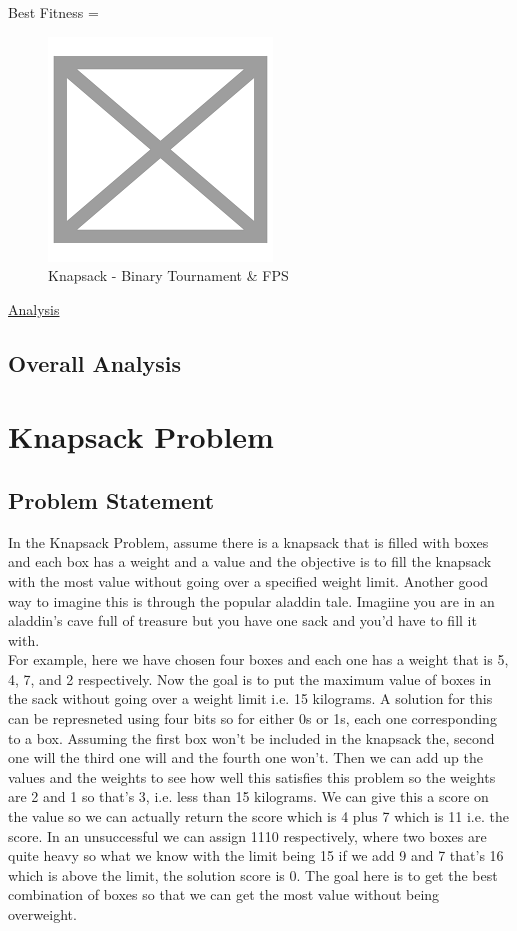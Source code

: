 \documentclass[11pt, letterpaper]{article}
\begin{document}
Best Fitness = 
\begin{figure}[H]
    \centering
    \includegraphics[scale = 0.6]{images/placeHolder.png}
    \caption {Knapsack - Binary Tournament \& FPS}
    \label {fig:tpsBF}
\end{figure}

\underline{Analysis}
\subsection {Overall Analysis}

\section{Knapsack Problem}
\subsection{Problem Statement}
In the Knapsack Problem, assume there is a knapsack that is filled with boxes and each box has a 
weight and a value and the objective is to fill the knapsack with the most value without going over 
a specified weight limit. Another good way to imagine this is through the popular aladdin tale. 
Imagiine you are in an aladdin's cave full of treasure but you have one sack and you'd have to fill 
it with.\\
For example, here we have chosen four boxes and each one has a weight that is 5, 4, 7, and 2 
respectively. Now the goal is to put the maximum value of boxes in the sack without going over a 
weight limit i.e. 15 kilograms. A solution for this can be represneted using four bits so for either 0s 
or 1s, each one corresponding to a box. Assuming the first box
won't be included in the knapsack 
the, second one will the third one will and the fourth one won't. Then we can add up the values 
and the weights to see how well this satisfies this problem so the weights are 2 and 1 so that's 3, i.e. 
less than 15 kilograms. We can give this a score on the
value so we can actually return the score 
which is 4 plus 7 which is 11 i.e. the score. In an unsuccessful we can assign 1110 respectively, 
where two boxes are quite heavy so what we know with the limit being 15 if we add 9 and 7 that's 
16 which is above the limit, the solution score is 0. The goal here is to get the best combination of 
boxes so that we can get the most value without being overweight.
\end{document}
